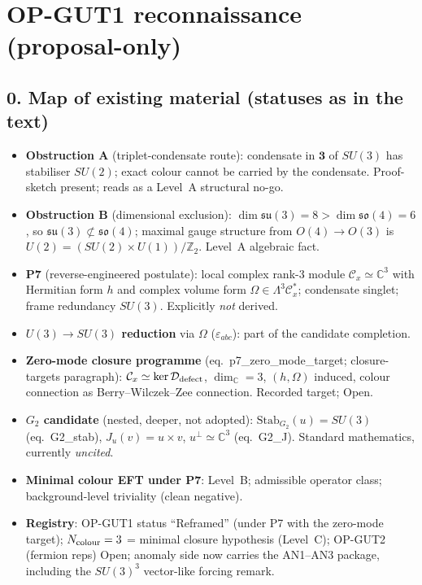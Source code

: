 \section*{OP-GUT1 reconnaissance (proposal-only)}

\subsection*{0. Map of existing material (statuses as in the text)}
\begin{itemize}
  \item \textbf{Obstruction A} (triplet-condensate route):
    condensate in $\mathbf 3$ of $SU(3)$ has stabiliser $SU(2)$;
    exact colour cannot be carried by the condensate.
    Proof-sketch present; reads as a Level~A structural no-go.
  \item \textbf{Obstruction B} (dimensional exclusion):
    $\dim\mathfrak{su}(3)=8>\dim\mathfrak{so}(4)=6$, so
    $\mathfrak{su}(3)\not\subset\mathfrak{so}(4)$; maximal gauge
    structure from $O(4)\to O(3)$ is
    $U(2)=(SU(2)\times U(1))/\mathbb Z_2$. Level~A algebraic fact.
  \item \textbf{P7} (reverse-engineered postulate): local complex
    rank-3 module $\mathcal C_x\simeq\mathbb C^3$ with Hermitian
    form $h$ and complex volume form
    $\Omega\in\Lambda^3\mathcal C_x^*$; condensate singlet; frame
    redundancy $SU(3)$. Explicitly \emph{not} derived.
  \item \textbf{$U(3)\to SU(3)$ reduction} via $\Omega$
    ($\varepsilon_{abc}$): part of the candidate completion.
  \item \textbf{Zero-mode closure programme}
    (eq.~p7\_zero\_mode\_target; closure-targets paragraph):
    $\mathcal C_x\simeq\ker\mathcal D_{\rm defect}$,
    $\dim_{\mathbb C}=3$, $(h,\Omega)$ induced, colour connection
    as Berry--Wilczek--Zee connection. Recorded target; Open.
  \item \textbf{$G_2$ candidate} (nested, deeper, not adopted):
    $\mathrm{Stab}_{G_2}(u)=SU(3)$ (eq.~G2\_stab),
    $J_u(v)=u\times v$, $u^\perp\simeq\mathbb C^3$ (eq.~G2\_J).
    Standard mathematics, currently \emph{uncited}.
  \item \textbf{Minimal colour EFT under P7}: Level~B; admissible
    operator class; background-level triviality (clean negative).
  \item \textbf{Registry}: OP-GUT1 status ``Reframed'' (under P7
    with the zero-mode target); $N_{\rm colour}=3$ = minimal
    closure hypothesis (Level~C); OP-GUT2 (fermion reps) Open;
    anomaly side now carries the AN1--AN3 package, including the
    $SU(3)^3$ vector-like forcing remark.
\end{itemize}


